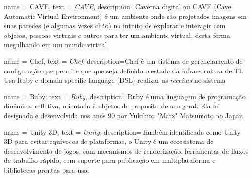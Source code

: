 {
	name = CAVE,
	text = \textit{CAVE},
	description={Caverna digital ou CAVE (Cave Automatic Virtual Environment) é um ambiente onde são projetados imagens em suas paredes (e algumas vezes chão) no intuito de explorar e interagir com objetos, pessoas virtuais e outros para ter um ambiente virtual, desta forma megulhando em um mundo virtual}
}

{
	name = Chef,
	text = \textit{Chef},
	description={Chef é um sistema de gerenciamento de configuração que permite que que seja definido o estado da infraestrutura de TI. Usa Ruby e  domain-specific language (DSL) realizar as \textit{receitas} no sistema}
}

{
	name = Ruby,
	text = \textit{Ruby},
	description={Ruby é uma linguagem de programação dinâmica, refletiva, orientada à objetos de proposito de uso geral. Ela foi designada e desenvolvida nos anos 90 por Yukihiro "Matz" Matsumoto no Japan}
}

{
	name = Unity 3D,
	text = \textit{Unity},
	description={Também identificado como Unity 3D para evitar equívocos de plataformas, o Unity é um ecossistema de desenvolvimento de jogos, com mecanismos de renderização, ferramentas de fluxos de trabalho rápido, com suporte para publicação em multiplataforma e bibliotecas prontas para uso.}
}

